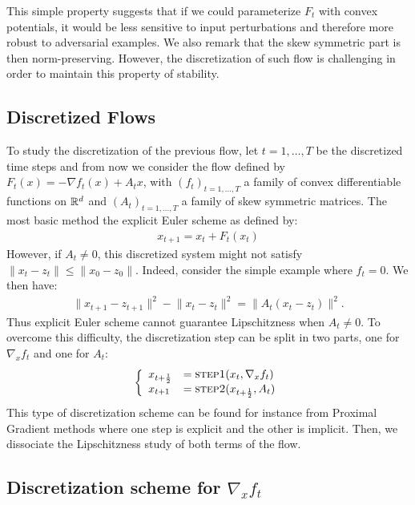 This simple property suggests that if we could parameterize $F_t$  with convex potentials, it would be less sensitive to input perturbations and therefore more robust to adversarial examples. We also remark that the skew symmetric part is then norm-preserving.
However, the discretization of such flow is challenging in order to maintain this property of stability. 


\subsection{Discretized Flows}

To study the discretization of  the previous flow, let $t=1,\dots,T$ be the discretized time steps and from now we consider the flow defined by  $F_t(x) = -\nabla f_{t}(x)+A_t x$, with $(f_{t})_{t=1,\dots,T}$  a family of convex differentiable functions on $\mathbb{R}^d$ and $(A_t)_{t=1,\dots,T}$ a family of skew symmetric matrices. The most basic method the explicit Euler scheme as defined by: 
\begin{align*}
x_{t+1} = x_t+ F_t(x_t)
\end{align*}
However, if $A_t\neq 0$, this discretized system might not satisfy $\lVert x_t-z_t\rVert\leq\lVert x_0-z_0\rVert$. Indeed, consider the simple example where $f_t=0$. We then have:
\begin{align*}
\lVert x_{t+1}-z_{t+1}\rVert^2 - \lVert x_{t}-z_{t}\rVert^2 =\lVert A_t\left(x_{t}-z_{t}\right)\rVert^2.
\end{align*}
Thus explicit Euler scheme cannot guarantee Lipschitzness when $A_t\neq 0$. To overcome this difficulty, the discretization step can be split in two parts, one for $\nabla_x f_t$ and one for $A_t$: 
\begin{align*}
   \left\{
    \begin{array}{ll}
        x_{t+\frac12} &= \textsc{step1}(x_t, \nabla_x f_t)\\
        x_{t+1}& = \textsc{step2}(x_{t+\frac12}, A_t)
    \end{array} 
    \right.
\end{align*}
This type of discretization scheme  can be found for instance from Proximal Gradient methods where one step is explicit and the other is implicit. Then, we dissociate the Lipschitzness study of both terms of the flow. 

\subsection{Discretization scheme for $\nabla_x f_t$}

